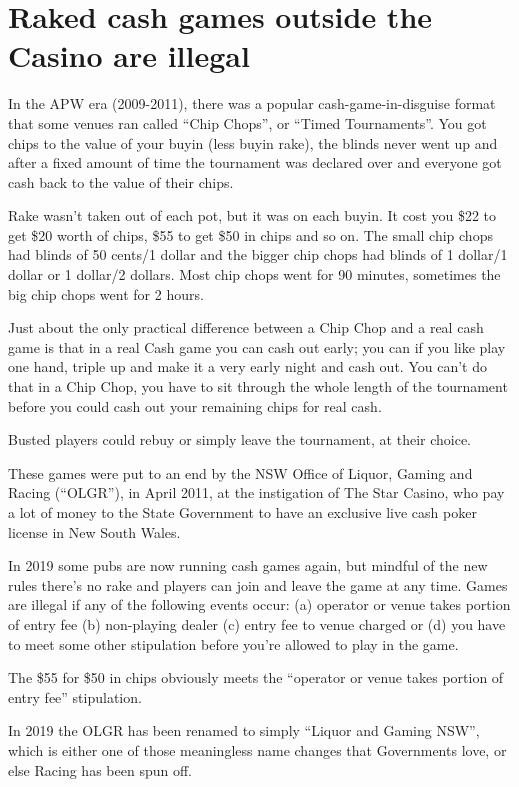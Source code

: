 \section{Raked cash games outside the Casino are illegal}

In the APW era (2009-2011), there was a popular
cash-game-in-disguise format that some venues ran
called ``Chip Chops'', or ``Timed Tournaments''.
You got chips to the value of your buyin (less buyin rake), the blinds
never went up and after a fixed amount of time the tournament was
declared over and everyone got cash back to the value of their chips.

Rake wasn't taken out of each pot, but it was on each buyin.
It cost you \$22 to get \$20 worth of chips, \$55 to get
\$50 in chips and so on. The small chip chops had blinds of
50 cents/1 dollar and the bigger chip chops had blinds of
1 dollar/1 dollar or 1 dollar/2 dollars. Most chip chops went for 90
minutes, sometimes the big chip chops went for 2 hours.

Just about the only practical difference between a
Chip Chop and a real cash game is that in a real Cash game
you can cash out early; you can if you like play one hand,
triple up and make it a very early night and cash out.
You can't do that in a Chip Chop, you have to sit through
the whole length of the tournament before you could cash out your
remaining chips for real cash.

Busted players could rebuy or simply leave the tournament,
at their choice.

These games were put to an end by the NSW Office of Liquor,
Gaming and Racing (``OLGR''), in April 2011, at the instigation of The
Star Casino, who pay a lot of money to the State Government to have an
exclusive live cash poker license in New South Wales.

In 2019 some pubs are now running cash games again, but mindful
of the new rules there's no rake and players can join and leave
the game at any time. Games are illegal if any of the following
events occur: (a) operator or venue takes portion of entry fee
(b) non-playing dealer (c) entry fee to venue charged or
(d) you have to meet some other stipulation before you're allowed
to play in the game.


The \$55 for \$50 in chips obviously meets the ``operator or venue takes
portion of entry fee'' stipulation.

In 2019 the OLGR has been renamed to simply
``Liquor and Gaming NSW'', which is either one of those meaningless
name changes that Governments love, or else Racing has been spun off.

